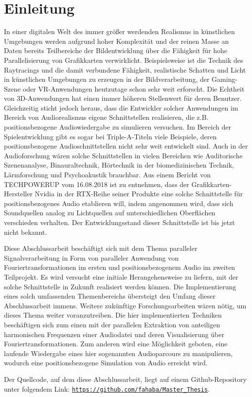 
\section{Einleitung}

In einer digitalen Welt des immer größer werdenden Realismus in künstlichen Umgebungen werden aufgrund hoher Komplexität und der reinen Masse an Daten bereits Teilbereiche der Bildentwicklung über die Fähigkeit für hohe Parallelisierung von Grafikkarten verwirklicht. Beispielsweise ist die Technik des Raytracings und die damit verbundene Fähigkeit, realistische Schatten und Licht in künstlichen Umgebungen zu erzeugen in der Bildverarbeitung, der Gaming-Szene oder VR-Anwendungen heutzutage schon sehr weit erforscht. Die Echtheit von 3D-Anwendungen hat einen immer höheren Stellenwert für deren Benutzer. Gleichzeitig sticht jedoch heraus, dass die Entwickler solcher Anwendungen im Bereich von Audiorealismus eigene Schnittstellen realisieren, die z.B. positionsbezogene Audiowiedergabe zu simulieren versuchen. Im Bereich der Spielentwicklung gibt es sogar bei Triple-A-Titeln viele Beispiele, deren positionsbezogene Audioschnittstellen nicht sehr weit entwickelt sind. Auch in der Audioforschung wären solche Schnittstellen in vielen Bereichen wie Auditorische Szenenanalyse, Binauraltechnik, Hörtechnik in der biomedizinischen Technik, Lärmforschung und Psychoakustik \cite{rwth_survey_categories} brauchbar. Aus einem Bericht von TECHPOWERUP \cite{atricle_audiotracing} vom 16.08.2018 ist zu entnehmen, dass der Grafikkarten-Hersteller Nvidia in der RTX-Reihe seiner Produkte eine solche Schnittstelle für positionsbezogenes Audio etablieren will, indem angenommen wird, dass sich Soundquellen analog zu Lichtquellen auf unterschiedlichen Oberflächen verschieden verhalten. Der Entwicklungsstand dieser Schnittstelle ist bis jetzt nicht bekannt.

Diese Abschlussarbeit beschäftigt sich mit dem Thema paralleler Signalverarbeitung in Form von paralleler Anwendung von Fouriertransformationen im ersten und positionsbezogenem Audio im zweiten Teilprojekt. Es wird versucht eine initiale Herangehensweise zu liefern, mit der solche Schnittstelle in Zukunft realisiert werden können. Die Implementierung eines solch umfassenden Themenbereichs übersteigt den Umfang dieser Abschlussarbeit immens. Weitere zukünftige Forschungsarbeiten wären nötig, um dieses Thema weiter voranzutreiben. Die hier implementierten Techniken beschäftigen sich zum einen mit der parallelen Extraktion von anteiligen harmonischen Frequenzen einer Audiodatei und deren Visualisierung über Fouriertransformationen. Zum anderen wird eine Möglichkeit geboten, eine laufende Wiedergabe eines hier sogenannten Audioparcours zu manipulieren, wodurch eine positionsbezogene Simulation von Audio erreicht wird.

Der Quellcode, auf dem diese Abschlussarbeit, liegt auf einem Github-Repository \cite{fahaba_github} unter folgendem Link:  \texttt{\href{https://github.com/fahaba/Master\_Thesis}{https://github.com/fahaba/Master\_Thesis}}.